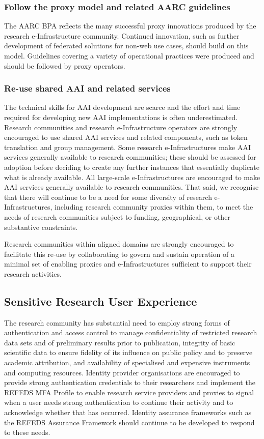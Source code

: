 \documentclass[fleqn,10pt]{wlscirep}
\begin{document}
{\subsubsection{Follow the proxy model and related AARC guidelines}
The AARC BPA reflects the many successful proxy innovations produced by the research e-Infrastructure community. Continued innovation, such as further development of federated solutions for non-web use cases, should build on this model. Guidelines covering a variety of operational practices were produced and should be followed by proxy operators.

\subsubsection{Re-use shared AAI and related services} 
The technical skills for AAI development are scarce and the effort and time required for developing new AAI implementations is often underestimated. Research communities and research e-Infrastructure operators are strongly encouraged to use shared AAI services and related components, such as token translation and group management. Some research e-Infrastructures make AAI services generally available to research communities; these should be assessed for adoption before deciding to create any further instances that essentially duplicate what is already available. All large-scale e-Infrastructures are encouraged to make AAI services generally available to research communities. That said, we recognise that there will continue to be a need for some diversity of research e-Infrastructures, including research community proxies within them, to meet the needs of research communities subject to funding, geographical, or other substantive constraints.

Research communities within aligned domains are strongly encouraged to facilitate this re-use by collaborating to govern and sustain operation of a minimal set of enabling proxies and e-Infrastructures sufficient to support their research activities. 

\subsection{Sensitive Research User Experience}
The research community has substantial need to employ strong forms of authentication and access control to manage confidentiality of restricted research data sets and of preliminary results prior to publication, integrity of basic scientific data to ensure fidelity of its influence on public policy and to preserve academic attribution, and availability of specialised and expensive instruments and computing resources. Identity provider organisations are encouraged to provide strong authentication credentials to their researchers and implement the REFEDS MFA Profile to enable research service providers and proxies to signal when a user needs strong authentication to continue their activity and to acknowledge whether that has occurred. Identity assurance frameworks such as the REFEDS Assurance Framework should continue to be developed to respond to these needs.

}
\end{document}
